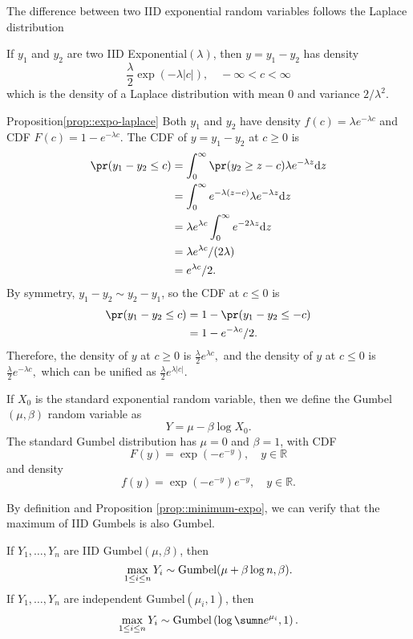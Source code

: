 The difference between two IID exponential random variables follows the Laplace distribution 

\begin{proposition}
\label{prop::expo-laplace}
If $y_1$ and $y_2$ are two IID Exponential$(\lambda)$, then $y = y_1 - y_2$ has  density 
$$
 \frac{\lambda}{2}  \exp( - \lambda | c| ),\quad -\infty < c<\infty
$$ 
which is the density of a Laplace distribution with mean $0$ and variance $2/\lambda^2$. 
\end{proposition}

\begin{myproof}{Proposition}{\ref{prop::expo-laplace}}
Both $y_{1}$ and $y_{2}$ have density $f(c)=\lambda e^{-\lambda c}$
and CDF $F(c)=1-e^{-\lambda c}$. The CDF of $y=y_{1}-y_{2}$ at $c\geq0$
is
\begin{align*}
 \pr(y_{1}-y_{2}  \leq c)&=\int_{0}^{\infty}\pr(y_{2}\geq z-c)\lambda e^{-\lambda z}\text{d}z\\
 & =\int_{0}^{\infty}e^{-\lambda(z-c)}\lambda e^{-\lambda z}\text{d}z\\
 & =\lambda e^{\lambda c}\int_{0}^{\infty}e^{-2\lambda z}\text{d}z\\
 & =\lambda e^{\lambda c}/(2\lambda)\\
 & =e^{\lambda c}/2.
\end{align*}
By symmetry, $y_{1}-y_{2}\sim y_{2}-y_{1}$, so the CDF at $c\leq0$
is
\begin{align*}
\pr(y_{1}-y_{2}  \leq c) & =1-\pr(y_{1}-y_{2}\leq-c)\\
 & =1-e^{-\lambda c}/2.
\end{align*}
Therefore, the density of $y$ at $c\geq0$ is 
$
\frac{\lambda}{2}e^{\lambda c},
$
and the density of $y$ at $c\leq0$ is
$
\frac{\lambda}{2}e^{-\lambda c},
$
which can be unified as 
$
\frac{\lambda}{2}e^{\lambda|c|}.
$
\end{myproof}

If $X_0 $ is the standard exponential random variable, then we define the Gumbel$(\mu, \beta)$ random variable as 
$$
Y = \mu - \beta \log X_0.
$$
The standard Gumbel distribution has $\mu =0$ and $\beta  =1$, with
CDF
\[
F(y)=\exp(-e^{-y}),\quad y\in\mathbb{R}
\]
and density
\[
f(y)=\exp(-e^{-y})e^{-y},\quad y\in\mathbb{R}.
\]


By definition and Proposition \ref{prop::minimum-expo}, we can verify that the maximum of IID Gumbels is also Gumbel. 

\begin{proposition}
\label{prop::max-gumbel}
If $Y_1, \ldots, Y_n$ are IID Gumbel$(\mu,\beta)$, then
$$
\max_{1\leq i \leq n}  Y_i \sim \textup{Gumbel}(\mu + \beta \log n, \beta ).
$$
If $Y_1, \ldots, Y_n$ are independent Gumbel$(\mu_i, 1)$, then
$$
\max_{1\leq i \leq n}  Y_i \sim \textup{Gumbel}\left(\log \sumn e^{\mu_i}, 1 \right). 
$$
\end{proposition}


